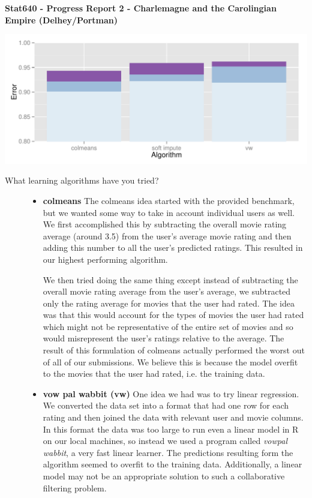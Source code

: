 \documentclass[oneside]{article}
\begin{document}
\begin{center}
\textbf{Stat640 - Progress Report 2 - Charlemagne and the Carolingian Empire (Delhey/Portman)}
\end{center}

\begin{center}
  \includegraphics[width = 0.7\linewidth]{vis}
\end{center}

{\small
\begin{description}
\item[What learning algorithms have you tried?]
  \begin{itemize}

  \item \textbf{colmeans} The colmeans idea started with the provided benchmark, but we wanted some way to take in account individual users as well. We first accomplished this by subtracting the overall movie rating average (around 3.5) from the user's average movie rating and then adding this number to all the user's predicted ratings. This resulted in our highest performing algorithm. 

We then tried doing the same thing except instead of subtracting the overall movie rating average from the user's average, we subtracted only the rating average for movies that the user had rated. The idea was that this would account for the types of movies the user had rated which might not be representative of the entire set of movies and so would misrepresent the user's ratings relative to the average. The result of this formulation of colmeans actually performed the worst out of all of our submissions. We believe this is because the model overfit to the movies that the user had rated, i.e. the training data.

  \item \textbf{vow pal wabbit (vw)} One idea we had was to try linear regression. We converted the data set into a format that had one row for each rating and then joined the data with relevant user and movie columns. In this format the data was too large to run even a linear model in R on our local machines, so instead we used a program called \textit{vowpal wabbit}, a very fast linear learner. The predictions resulting form the algorithm seemed to overfit to the training data. Additionally, a linear model may not be an appropriate solution to such a collaborative filtering problem.


\end{itemize}
\end{description}}
\end{document}
